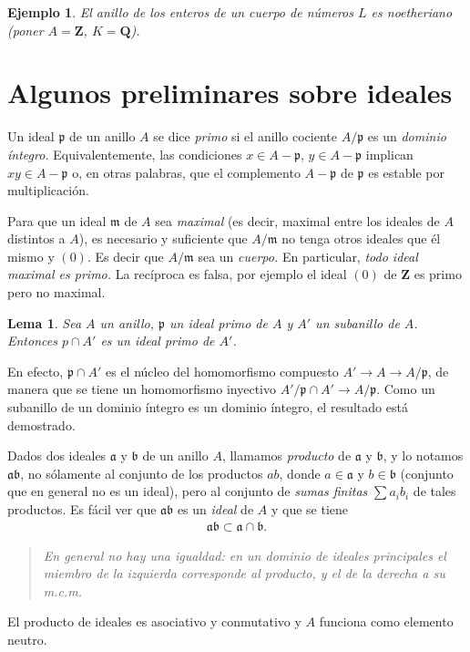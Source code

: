 \documentclass[bibtotoc,leqno,spanish]{amsbook}
\newcommand{\QQ}{\mathbf{Q}}
\newcommand{\ZZ}{\mathbf{Z}}
\newcommand{\idl}[1]{\mathfrak{#1}}
\renewcommand{\to}[1][]{\xrightarrow{#1}}
\numberwithin{equation}{section}
\newenvironment{comm}%
	{\begin{quotation}\itshape}
	{\end{quotation}}
\theoremstyle{note}
\theoremstyle{note}
\newtheorem{lemma}{Lema}
\theoremstyle{rem}
\newtheorem*{example*}{Ejemplo}
\numberwithin{theorem}{section}
\numberwithin{proposition}{section}
\numberwithin{definition}{section}
\numberwithin{lemma}{section}
\numberwithin{corollary}{section}
\numberwithin{example}{section}
\numberwithin{footnote}{section}%
\begin{document}
\begin{example*}
El anillo de los enteros de un cuerpo de n\'umeros $L$ es {\em noetheriano} (poner $A = \ZZ$,
$K = \QQ$).
\end{example*}

\section{Algunos preliminares sobre ideales}\label{sec3.3}

Un ideal $\idl{p}$ de un anillo $A$ se dice {\em primo} si el anillo cociente $A/\idl{p}$
es un {\em dominio \'integro.} Equivalentemente, las condiciones $x\in A-\idl{p}$,
$y\in A-\idl{p}$ implican $xy\in A-\idl{p}$ o, en otras palabras, que el complemento
$A-\idl{p}$ de $\idl{p}$ es estable por multiplicaci\'on.

Para que un ideal $\idl{m}$ de $A$ sea {\em maximal} (es decir, maximal entre los ideales de
$A$ distintos a $A$), es necesario y suficiente que $A/\idl{m}$ no tenga otros ideales que \'el mismo
y $(0)$. Es decir que $A/\idl{m}$ sea un {\em cuerpo.}  En particular,
{\em todo ideal maximal es primo.} La rec\'iproca es falsa, por ejemplo el ideal $(0)$ de $\ZZ$
es primo pero no maximal.

\begin{lemma}\label{lem3.3.1}
Sea $A$ un anillo, $\idl{p}$ un ideal primo de $A$ y $A'$ un subanillo de $A$. Entonces
$p\cap A'$ es un ideal primo de $A'$.
\end{lemma}

En efecto, $\idl{p}\cap A'$ es el n\'ucleo del homomorfismo compuesto $A'\to A\to A/\idl{p}$,
de manera que se tiene un homomorfismo inyectivo $A'/\idl{p}\cap A'\to A/\idl{p}$. Como un
subanillo de un dominio \'integro es un dominio \'integro, el resultado est\'a demostrado.

Dados dos ideales $\idl{a}$ y $\idl{b}$ de un anillo $A$, llamamos {\em producto} de $\idl{a}$
y $\idl{b}$, y lo notamos $\idl{a}\idl{b}$, no s\'olamente al conjunto de los productos
$ab$, donde $a\in\idl{a}$ y $b\in\idl{b}$ (conjunto que en general no es un ideal), pero al
conjunto de {\em sumas finitas} $\sum a_{i}b_{i}$ de tales productos. Es f\'acil ver que
$\idl{a}\idl{b}$ es un {\em ideal} de $A$ y que se tiene
\begin{gather*}
\idl{a}\idl{b}\subset\idl{a}\cap\idl{b}.
\end{gather*}

\begin{comm}
En general no hay una igualdad: en un dominio de ideales principales el miembro de la izquierda
corresponde al producto, y el de la derecha a su m.c.m.
\end{comm}
El producto de ideales es asociativo y conmutativo y $A$ funciona como elemento neutro.
\end{document}
